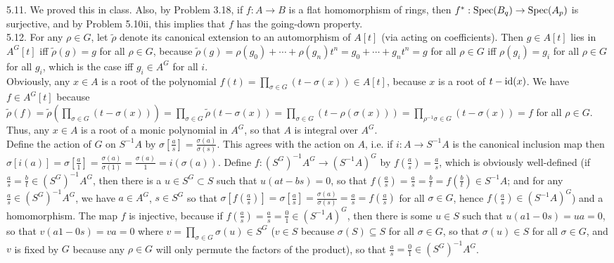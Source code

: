 \documentclass[11pt]{article}
\begin{document}

\num{5.11.} We proved this in class. Also, by Problem 3.18, if $f:A\rightarrow B$ is a flat homomorphism of rings, then $f^*:\operatorname{Spec}(B_q)\rightarrow\operatorname{Spec}(A_p)$ is surjective, and by Problem 5.10ii, this implies that $f$ has the going-down property.    \\

\num{5.12.} For any $\rho\in G$, let $\tilde{\rho}$ denote its canonical extension to an automorphism of $A[t]$ (via acting on coefficients). Then $g\in A[t]$ lies in $A^G[t]$ iff $\tilde{\rho}(g)=g$ for all $\rho\in G$, because $\tilde{\rho}(g)=\rho(g_0)+\cdots+\rho(g_n)t^n=g_0+\cdots+g_nt^n=g$ for all $\rho\in G$ iff $\rho(g_i)=g_i$ for all $\rho\in G$ for all $g_i$, which is the case iff $g_i\in A^G$ for all $i$. \\

Obviously, any $x\in A$ is a root of the polynomial $f(t)=\prod_{\sigma\in G}(t-\sigma(x))\in A[t]$, because $x$ is a root of $t-\operatorname{id}(x)$. We have $f\in A^G[t]$ because $\tilde{\rho}(f)=\tilde{\rho}\left(\prod_{\sigma\in G}(t-\sigma(x))\right)=\prod_{\sigma\in G}\tilde{\rho}(t-\sigma(x))=\prod_{\sigma\in G}(t-\rho(\sigma(x)))=\prod_{\rho^{-1}\sigma\in G}(t-\sigma(x))=f$ for all $\rho\in G$. Thus, any $x\in A$ is a root of a monic polynomial in $A^G$, so that $A$ is integral over $A^G$.   \\

Define the action of $G$ on $S^{-1}A$ by $\sigma[\frac{a}{s}]=\frac{\sigma(a)}{\sigma(s)}$. This agrees with the action on $A$, i.e. if $i:A\rightarrow S^{-1}A$ is the canonical inclusion map then $\sigma[i(a)]=\sigma[\frac{a}{1}]=\frac{\sigma(a)}{\sigma(1)}=\frac{\sigma(a)}{1}=i(\sigma(a))$. Define $f:(S^G)^{-1}A^G\rightarrow (S^{-1}A)^G$ by $f(\frac{a}{s})=\frac{a}{s}$, which is obviously well-defined (if $\frac{a}{s}=\frac{b}{t}\in (S^G)^{-1}A^G$, then there is a $u\in S^G\subset S$ such that $u(at-bs)=0$, so that $f(\frac{a}{s})=\frac{a}{s}=\frac{b}{t}=f(\frac{b}{t})\in S^{-1}A$; and for any $\frac{a}{s}\in (S^G)^{-1}A^G$, we have $a\in A^G$, $s\in S^G$ so that $\sigma[f(\frac{a}{s})]=\sigma[\frac{a}{s}]=\frac{\sigma(a)}{\sigma(s)}=\frac{a}{s}=f(\frac{a}{s})$ for all $\sigma\in G$, hence $f(\frac{a}{s})\in (S^{-1}A)^G$) and a homomorphism. The map $f$ is injective, because if $f(\frac{a}{s})=\frac{a}{s}=\frac{0}{1}\in (S^{-1}A)^G$, then there is some $u\in S$ such that $u(a1-0s)=ua=0$, so that $v(a1-0s)=va=0$ where $v=\prod_{\sigma\in G}\sigma(u)\in S^G$ ($v\in S$ because $\sigma(S)\subseteq S$ for all $\sigma\in G$, so that $\sigma(u)\in S$ for all $\sigma\in G$, and $v$ is fixed by $G$ because any $\rho\in G$ will only permute the factors of the product), so that $\frac{a}{s}=\frac{0}{1}\in (S^G)^{-1}A^G$. \\
\end{document}
